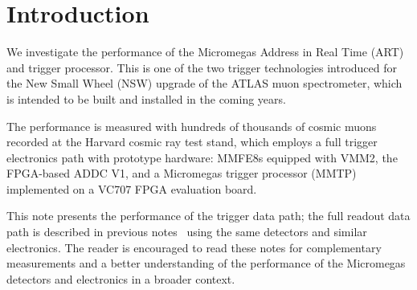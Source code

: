 \section{Introduction}
\label{sec:intro}

We investigate the performance of the Micromegas Address in Real Time (ART) and trigger processor. This is one of the two trigger technologies introduced for the New Small Wheel (NSW) upgrade of the ATLAS muon spectrometer, which is intended to be built and installed in the coming years. 

The performance is measured with hundreds of thousands of cosmic muons recorded at the Harvard cosmic ray test stand, which employs a full trigger electronics path with prototype hardware: MMFE8s equipped with VMM2, the FPGA-based ADDC V1, and a Micromegas trigger processor (MMTP) implemented on a VC707 FPGA evaluation board.

This note presents the performance of the trigger data path; the full readout data path is described in previous notes~\cite{noisy,noiseless} using the same detectors and similar electronics. The reader is encouraged to read these notes for complementary measurements and a better understanding of the performance of the Micromegas detectors and electronics in a broader context.

